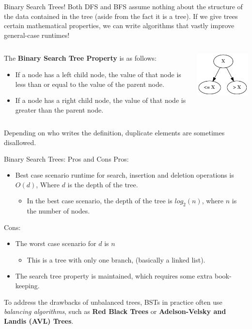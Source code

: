 \documentclass[11pt]{beamer}
\begin{document}
\begin{frame}{Binary Search Trees!}
Both DFS and BFS assume nothing about the structure of the data contained in the tree (aside from the fact it is a tree).
If we give trees certain mathematical properties, we can write algorithms that vastly improve general-case runtimes! 
\vspace{1em}
\begin{columns}
\begin{column}{0.75\textwidth}
The \textbf{Binary Search Tree Property} is as follows:
\begin{itemize}
\item If a node has a left child node, the value of that node is less than or equal to the value of the parent node.
\item If a node has a right child node, the value of that node is greater than the parent node.  
\end{itemize}
\end{column}
\begin{column}{0.25\textwidth}
\center
\includegraphics[scale=0.3]{graphs/BST_simple.png}
\end{column}
\end{columns}
\vspace{0.5em}
Depending on who writes the definition, duplicate elements are sometimes disallowed.
\end{frame}

\begin{frame}{Binary Search Trees: Pros and Cons}
Pros:
\begin{itemize}
\item Best case scenario runtime for search, insertion and deletion operations is $O(d)$, Where $d$ is the depth of the tree.
\begin{itemize}
\item In the best case scenario, the depth of the tree is $log_2(n)$, where $n$ is the number of nodes.  
\end{itemize}
\end{itemize}
Cons:
\begin{itemize}
\item The worst case scenario for $d$ is $n$
\begin{itemize}
\item This is a tree with only one branch, (basically a linked list).  
\end{itemize}
\item The search tree property is maintained, which requires some extra book-keeping.  
\end{itemize}
To address the drawbacks of unbalanced trees, BSTs in practice often use \emph{balancing algorithms}, such as \textbf{Red Black Trees} or \textbf{Adelson-Velsky and Landis (AVL) Trees}.
\end{frame}
\end{document}
